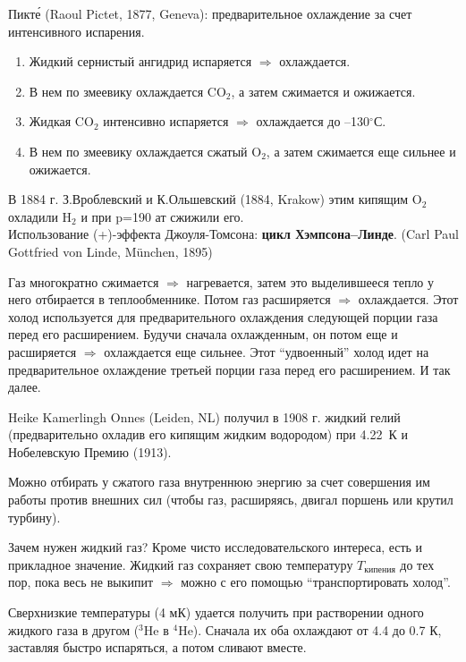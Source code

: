 \noindent
Пикт\'{е} (Raoul Pictet, 1877, Geneva): предварительное охлаждение за счет интенсивного испарения.
\begin{enumerate}
\item Жидкий сернистый ангидрид испаряется $\Rightarrow$ охлаждается.
\item В нем по змеевику охлаждается CO$_2$, а затем сжимается и ожижается.
\item Жидкая CO$_2$ интенсивно испаряется $\Rightarrow$ охлаждается до --130$^\circ$С.
\item В нем по змеевику охлаждается сжатый O$_2$, а затем сжимается еще сильнее и ожижается.
\end{enumerate}
В 1884 г. З.Вроблевский и К.Ольшевский (1884, Krakow) этим кипящим O$_2$ охладили H$_2$ и при p=190 ат сжижили его.\\
Использование (+)-эффекта Джоуля-Томсона: {\bf цикл Хэмпсона--Линде}.
(Carl Paul Gottfried von Linde, M\"{u}nchen, 1895)

Газ многократно сжимается $\Rightarrow$ нагревается, затем это выделившееся тепло у него отбирается в теплообменнике. Потом газ расширяется $\Rightarrow$ охлаждается. Этот холод используется для предварительного охлаждения следующей порции газа перед его расширением. Будучи сначала охлаж\-ден\-ным, он потом еще и расширяется $\Rightarrow$ охлаждается еще сильнее. Этот ``удвоенный'' холод идет на предварительное охлаждение третьей порции газа перед его расширением. И так далее.

Heike Kamerlingh Onnes (Leiden, NL) получил в 1908 г. жидкий гелий (предварительно охладив его кипящим жидким водородом) при 4.22~К и Нобелевскую Премию (1913).

Можно отбирать у сжатого газа внутреннюю энергию за счет совер\-ше\-ния им работы против внешних сил (чтобы газ, расширяясь, двигал поршень или крутил турбину).

Зачем нужен жидкий газ? Кроме чисто исследовательского интереса, есть и прикладное значение. Жидкий газ сохраняет свою температуру $T_{\texttt{кипения}}$ до тех пор, пока весь не выкипит $\Rightarrow$ можно с его помощью ``транспортировать холод''.

Сверхнизкие температуры (4 мК) удается получить при растворении одного жидкого газа в другом ($^3$He в $^4$He). Сначала их оба охлаждают от 4.4 до 0.7 К, заставляя быстро испаряться, а потом сливают вместе.

